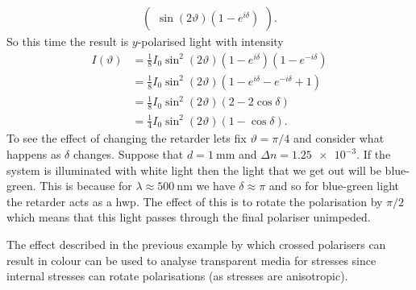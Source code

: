 \begin{example}
\begin{align*}
\begin{pmatrix}
                \sin(2\vartheta)(1 - e^{i\delta})
            \end{pmatrix}
            .
        \end{align*}
        So this time the result is \(y\)-polarised light with intensity
        \begin{align*}
            I(\vartheta) &= \frac{1}{8}I_0\sin^2(2\vartheta)(1 - e^{i\delta})(1 - e^{-i\delta})\\
            &= \frac{1}{8}I_0\sin^2(2\vartheta)(1 - e^{i\delta} - e^{-i\delta} + 1)\\
            &= \frac{1}{8}I_0\sin^2(2\vartheta)(2 - 2\cos\delta)\\
            &= \frac{1}{4}I_0\sin^2(2\vartheta)(1 - \cos\delta).
        \end{align*}
        To see the effect of changing the retarder lets fix \(\vartheta = \pi/4\) and consider what happens as \(\delta\) changes.
        Suppose that \(d = \SI{1}{\milli\metre}\) and \(\Delta n = \num{1.25e-3}\).
        If the system is illuminated with white light then the light that we get out will be blue-green.
        This is because for \(\lambda \approx \SI{500}{\nano\meter}\) we have \(\delta\approx \pi\) and so for blue-green light the retarder acts as a \gls{hwp}.
        The effect of this is to rotate the polarisation by \(\pi/2\) which means that this light passes through the final polariser unimpeded.
    \end{example}
    The effect described in the previous example by which crossed polarisers can result in colour can be used to analyse transparent media for stresses since internal stresses can rotate polarisations (as stresses are anisotropic).
    
